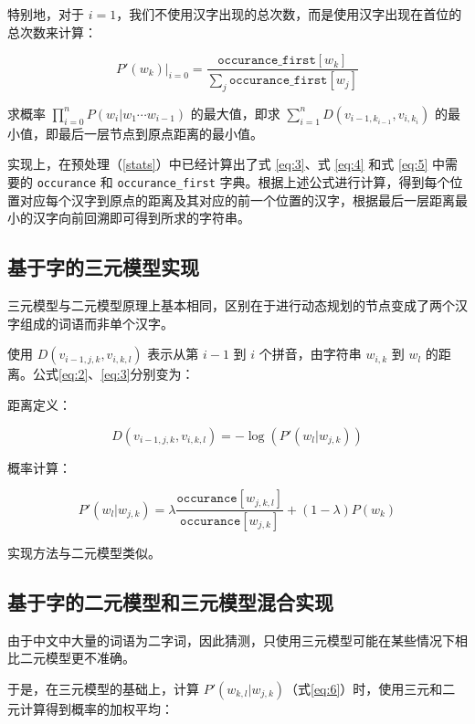 \documentclass[a4paper]{article}
\begin{document}
特别地，对于 $i=1$，我们不使用汉字出现的总次数，而是使用汉字出现在首位的总次数来计算：

\begin{equation}\label{eq:5}
    P'(w_k)\Big|_{i=0} = \frac{\texttt{occurance\_first}[w_{k}]}{\sum_j \texttt{occurance\_first}[w_{j}]}
\end{equation}

求概率 $\prod_{i=0}^{n}P(w_i|w_1\cdots w_{i-1})$ 的最大值，即求 $\sum_{i=1}^nD(v_{i-1, k_{i-1}}, v_{i, k_i})$ 的最小值，即最后一层节点到原点距离的最小值。

实现上，在预处理（\ref{stats}）中已经计算出了式 \ref{eq:3}、式 \ref{eq:4} 和式 \ref{eq:5} 中需要的 \texttt{occurance} 和 \texttt{occurance\_first} 字典。根据上述公式进行计算，得到每个位置对应每个汉字到原点的距离及其对应的前一个位置的汉字，根据最后一层距离最小的汉字向前回溯即可得到所求的字符串。

\subsection{基于字的三元模型实现}

三元模型与二元模型原理上基本相同，区别在于进行动态规划的节点变成了两个汉字组成的词语而非单个汉字。

使用 $D(v_{i-1,j,k},v_{i,k,l})$ 表示从第 $i-1$ 到 $i$ 个拼音，由字符串 $w_{i,k}$ 到 $w_l$ 的距离。公式\ref{eq:2}、\ref{eq:3}分别变为：

距离定义：

\begin{equation}
    D(v_{i-1,j,k},v_{i,k,l}) = -\log(P'(w_{l}|w_{j,k}))
\end{equation}

概率计算：

\begin{equation}\label{eq:6}
    P'(w_{l}|w_{j,k}) =
        \lambda\frac{\texttt{occurance}[w_{j,k,l}]}{\texttt{occurance}[w_{j,k}]}
        + (1-\lambda)P(w_{k})
\end{equation}

实现方法与二元模型类似。

\subsection{基于字的二元模型和三元模型混合实现}\label{hybrid}

由于中文中大量的词语为二字词，因此猜测，只使用三元模型可能在某些情况下相比二元模型更不准确。

于是，在三元模型的基础上，计算 $P'(w_{k,l}|w_{j,k})$（式\ref{eq:6}）时，使用三元和二元计算得到概率的加权平均：
\end{document}
